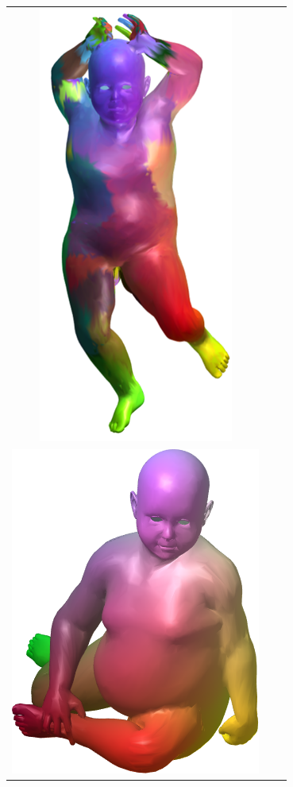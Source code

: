\begin{figure}[h!]
\begin{tabular}{ccc}
		\includegraphics[scale=0.4]{figures/Top2DDIS.png} \\
		\includegraphics[scale=0.3]{figures/kid22_base.png} &

\end{tabular}
\end{figure}
